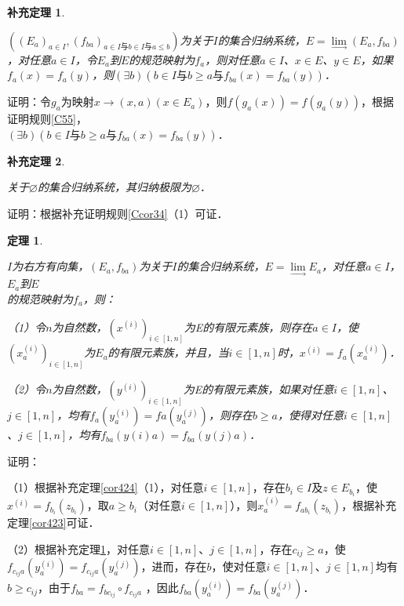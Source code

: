 \documentclass[12pt, a4paper, oneside]{book}
\newtheorem{theo}{定理}
\newtheorem{cor}{补充定理}
\begin{document}
			\begin{cor}\label{cor425}
				\hfill\par
				$((E_a)_{a\in I}, (f_{ba})_{a\in I\text{与}b\in I\text{与}a\leq b})$为关于$I$的集合归纳系统，$E=\lim\limits_\to (E_a, f_{ba})$，对任意$a\in I$，令$E_a$到$E$的规范映射为$f_a$，则对任意$a\in I$、$x\in E$、$y\in E$，如果$f_a(x)=f_a (y)$，则$(\exists b)(b\in I\text{与}b\geq a\text{与}f_{ba}(x)= f_{ba}(y))$．
			\end{cor}
			证明：令$g_a$为映射$x\to (x, a)(x\in E_a)$，则$f(g_a(x))=f(g_a(y))$，根据证明规则\ref{C55}，\\$(\exists b)(b\in I\text{与}b\geq a\text{与}f_{ba}(x)= f_{ba}(y))$．
			
			\begin{cor}\label{cor426}
				\hfill\par
				关于$\varnothing$的集合归纳系统，其归纳极限为$\varnothing$．
			\end{cor}
			证明：根据补充证明规则\ref{Ccor34}（1）可证．
					
			\begin{theo}\label{theo183}
				\hfill\par
				$I$为右方有向集，$(E_a, f_{ba})$为关于$I$的集合归纳系统，$E= \lim\limits_\to E_a$，对任意$a\in I$，$E_a$到$E$\\的规范映射为$f_a$，则：
				\par
				（1）令$n$为自然数，$(x^{(i)})_{i\in [1, n]}$为E的有限元素族，则存在$a\in I$，使$(x^{(i)}_a)_{i\in [1, n]}$为$E_a$的有限元素族，并且，当$i\in [1, n]$时，$x^{(i)}=f_a(x^{(i)}_a)$．
				\par
				（2）令$n$为自然数，$(y^{(i)})_{i\in [1, n]}$为E的有限元素族，如果对任意$i\in [1, n]$、$j\in [1, n]$，均有$f_a(y^{(i)}_a)=fa(y^{(j)}_a)$，则存在$b\geq a$，使得对任意$i\in [1, n]$、$j\in [1, n]$，均有$f_{ba}(y(i)a)=f_{ba}(y(j)a)$．
			\end{theo}
			证明：
			\par
			（1）根据补充定理\ref{cor424}（1），对任意$i\in [1, n]$，存在$b_i\in I$及$z\in E_{b_i}$，使$x^{(i)}=f_{b_i}(z_{b_i})$，取$a\geq b_i$（对任意$i\in [1, n]$），则$x^{(i)}_a=f_{a b_i}(z_{b_i})$，根据补充定理\ref{cor423}可证．
			\par
			（2）根据补充定理\ref{cor425}，对任意$i\in [1, n]$、$j\in [1, n]$，存在$c_{ij}\geq a$，使$f_{c_{ij} a}(y^{(i)}_a)=f_{c_{ij} a}(y^{(j)}_a)$，进而，存在$b$，使对任意$i\in [1, n]$、$j\in [1, n]$均有$b\geq c_{ij}$，由于$f_{ba} =f_{b c_{ij}}\circ f_{c_{ij} a}$ ，因此$f_{ba}(y^{(i)}_a)=f_{ba}(y^{(j)}_a)$．
					
\end{document}
